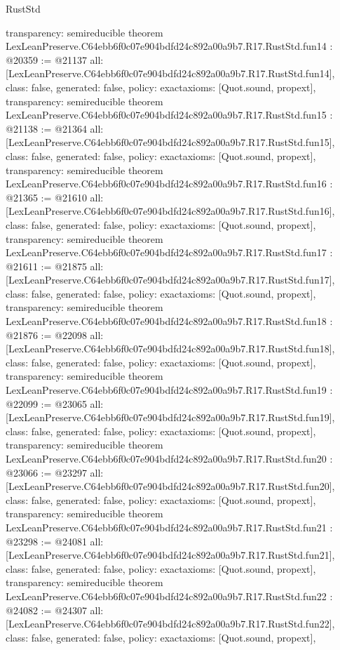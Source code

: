 \begin{lexlean}{RustStd}
\begin{coremodule}
{  transparency: semireducible
}
theorem LexLeanPreserve.C64ebb6f0c07e904bdfd24c892a00a9b7.R17.RustStd.fun14 : @20359 := @21137 {
  all: [LexLeanPreserve.C64ebb6f0c07e904bdfd24c892a00a9b7.R17.RustStd.fun14],
  class: false,
  generated: false,
  policy: exact{axioms: [Quot.sound, propext]},
  transparency: semireducible
}
theorem LexLeanPreserve.C64ebb6f0c07e904bdfd24c892a00a9b7.R17.RustStd.fun15 : @21138 := @21364 {
  all: [LexLeanPreserve.C64ebb6f0c07e904bdfd24c892a00a9b7.R17.RustStd.fun15],
  class: false,
  generated: false,
  policy: exact{axioms: [Quot.sound, propext]},
  transparency: semireducible
}
theorem LexLeanPreserve.C64ebb6f0c07e904bdfd24c892a00a9b7.R17.RustStd.fun16 : @21365 := @21610 {
  all: [LexLeanPreserve.C64ebb6f0c07e904bdfd24c892a00a9b7.R17.RustStd.fun16],
  class: false,
  generated: false,
  policy: exact{axioms: [Quot.sound, propext]},
  transparency: semireducible
}
theorem LexLeanPreserve.C64ebb6f0c07e904bdfd24c892a00a9b7.R17.RustStd.fun17 : @21611 := @21875 {
  all: [LexLeanPreserve.C64ebb6f0c07e904bdfd24c892a00a9b7.R17.RustStd.fun17],
  class: false,
  generated: false,
  policy: exact{axioms: [Quot.sound, propext]},
  transparency: semireducible
}
theorem LexLeanPreserve.C64ebb6f0c07e904bdfd24c892a00a9b7.R17.RustStd.fun18 : @21876 := @22098 {
  all: [LexLeanPreserve.C64ebb6f0c07e904bdfd24c892a00a9b7.R17.RustStd.fun18],
  class: false,
  generated: false,
  policy: exact{axioms: [Quot.sound, propext]},
  transparency: semireducible
}
theorem LexLeanPreserve.C64ebb6f0c07e904bdfd24c892a00a9b7.R17.RustStd.fun19 : @22099 := @23065 {
  all: [LexLeanPreserve.C64ebb6f0c07e904bdfd24c892a00a9b7.R17.RustStd.fun19],
  class: false,
  generated: false,
  policy: exact{axioms: [Quot.sound, propext]},
  transparency: semireducible
}
theorem LexLeanPreserve.C64ebb6f0c07e904bdfd24c892a00a9b7.R17.RustStd.fun20 : @23066 := @23297 {
  all: [LexLeanPreserve.C64ebb6f0c07e904bdfd24c892a00a9b7.R17.RustStd.fun20],
  class: false,
  generated: false,
  policy: exact{axioms: [Quot.sound, propext]},
  transparency: semireducible
}
theorem LexLeanPreserve.C64ebb6f0c07e904bdfd24c892a00a9b7.R17.RustStd.fun21 : @23298 := @24081 {
  all: [LexLeanPreserve.C64ebb6f0c07e904bdfd24c892a00a9b7.R17.RustStd.fun21],
  class: false,
  generated: false,
  policy: exact{axioms: [Quot.sound, propext]},
  transparency: semireducible
}
theorem LexLeanPreserve.C64ebb6f0c07e904bdfd24c892a00a9b7.R17.RustStd.fun22 : @24082 := @24307 {
  all: [LexLeanPreserve.C64ebb6f0c07e904bdfd24c892a00a9b7.R17.RustStd.fun22],
  class: false,
  generated: false,
  policy: exact{axioms: [Quot.sound, propext]},
}
\end{coremodule}
\end{lexlean}
